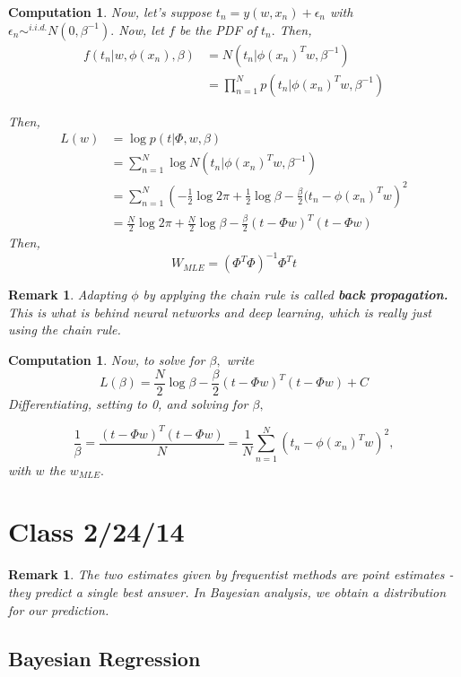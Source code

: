 \documentclass{amsart}
\newtheorem{comp}[subsubsection]{Computation}
\newtheorem{rem}[subsubsection]{Remark}
\begin{document}
\begin{comp}
Now, let's suppose $t_n = y(w,x_n) + \epsilon_n$ with $\epsilon_n \sim^{i.i.d.} N(0,\beta^{-1}).$ Now, let $f$ be the PDF of $t_n.$ Then,
\begin{align*}
f(t_n|w,\phi(x_n),\beta) &= N(t_n|\phi(x_n)^Tw, \beta^{-1}) 
\\
&= \prod_{n=1}^N p(t_n|\phi(x_n)^Tw, \beta^{-1})
\end{align*}

Then,
\begin{align*}
L(w) & = \log{p(t|\Phi,w,\beta)} 
\\
&= \sum_{n=1}^N \log{N(t_n|\phi(x_n)^Tw,\beta^{-1})}
\\
&= \sum_{n=1}^N \left(-\frac 1 2 \log{2\pi} + \frac 1 2 \log{\beta} - \frac \beta 2 (t_n - \phi(x_n)^T w \right)^2
\\
&= \frac N 2 \log{2\pi} + \frac N 2 \log \beta - \frac \beta 2 (t-\Phi w)^T(t-\Phi w)
\end{align*}
Then, $$W_{MLE} = (\Phi^T \Phi)^{-1} \Phi^T t$$
\end{comp}

\begin{rem}
Adapting $\phi$ by applying the chain rule is called {\bf back propagation.} This is what is behind neural networks and deep learning, which is really just using the chain rule.
\end{rem}

\begin{comp}
Now, to solve for $\beta,$ write
$$L(\beta) = \frac N 2 \log \beta - \frac \beta 2 (t-\Phi w)^T(t - \Phi w)+C$$
Differentiating, setting to 0, and solving for $\beta,$

$$\frac 1 \beta = \frac {(t-\Phi w)^T(t-\Phi w)} N = \frac 1 N \sum_{n=1}^N(t_n - \phi(x_n)^T w)^2,$$  
with $w$ the $w_{MLE}.$
\end{comp}

\section{Class 2/24/14}

\begin{rem}
The two estimates given by frequentist methods are point estimates - they predict a single best answer. In Bayesian analysis, we obtain a distribution for our prediction.
\end{rem}
\subsection{Bayesian Regression}
\end{document}
